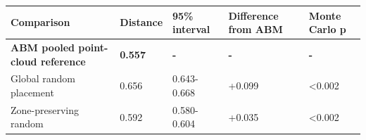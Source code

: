 \begin{tabular}{lllll}
\toprule
\textbf{Comparison} & \textbf{Distance} & \textbf{95\% interval} & \textbf{Difference from ABM} & \textbf{Monte Carlo p} \\
\midrule
\textbf{ABM pooled point-cloud reference} & \textbf{0.557} & \textbf{-} & \textbf{-} & \textbf{-} \\
Global random placement & 0.656 & 0.643-0.668 & +0.099 & <0.002 \\
Zone-preserving random & 0.592 & 0.580-0.604 & +0.035 & <0.002 \\
\bottomrule
\end{tabular}
